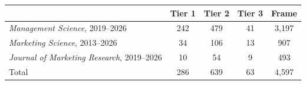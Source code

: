\begin{tabular}{lcccc}
\toprule
 & Tier 1 & Tier 2 & Tier 3 & Frame \\
\midrule
\emph{Management Science}, 2019--2026 & 242 & 479 & 41 & 3,197 \\
\emph{Marketing Science}, 2013--2026 & 34 & 106 & 13 & 907 \\
\emph{Journal of Marketing Research}, 2019--2026 & 10 & 54 & 9 & 493 \\
\midrule
Total & 286 & 639 & 63 & 4,597 \\
\bottomrule
\end{tabular}
